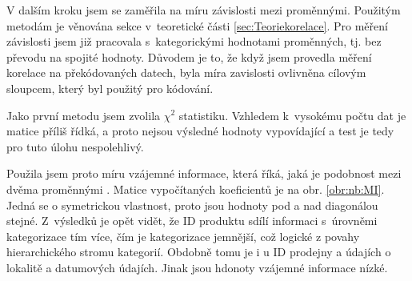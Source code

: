 V dalším kroku jsem se zaměřila na míru závislosti mezi proměnnými. Použitým metodám je věnována sekce v~teoretické části \ref{sec:Teoriekorelace}. 
Pro měření závislosti jsem již pracovala s~kategorickými hodnotami proměnných, tj. bez převodu na spojité hodnoty. Důvodem je to, že když jsem provedla měření korelace na překódovaných datech, byla míra zavislosti ovlivněna cílovým sloupcem, který byl použitý pro kódování.

 
Jako první metodu jsem zvolila  $\chi^2$ statistiku. Vzhledem k~vysokému počtu dat je matice příliš řídká, a proto nejsou výsledné hodnoty vypovídající a test je tedy pro tuto úlohu nespolehlivý.

Použila jsem proto míru vzájemné informace, která říká, jaká je podobnost mezi dvěma proměnnými \cite{bib:scikit}.
Matice vypočítaných koeficientů je na obr. \ref*{obr:nb:MI}. Jedná se o symetrickou vlastnost, proto jsou hodnoty pod a nad diagonálou stejné. Z~výsledků je opět vidět, že ID produktu sdílí informaci s~úrovněmi kategorizace tím více, čím je kategorizace jemnější, což logické z povahy hierarchického stromu kategorií. Obdobně tomu je i u ID prodejny a údajích o lokalitě a datumových údajích. Jinak jsou hdonoty vzájemné informace nízké.

